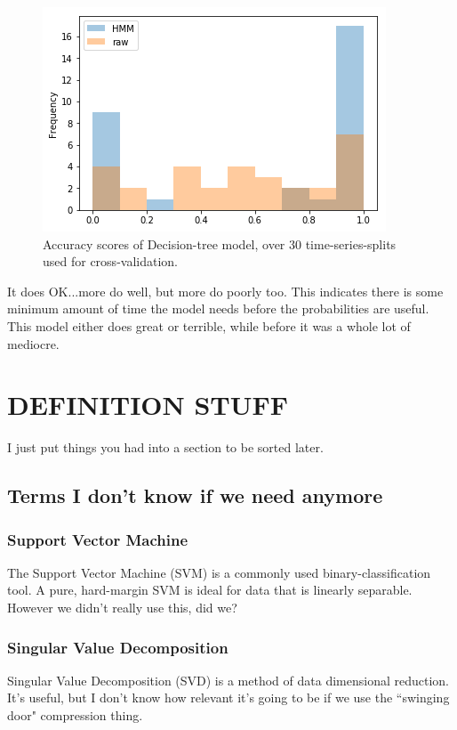 \documentclass[twocolumn,10pt]{article}
\begin{document}
\begin{figure}
    \centering
    \includegraphics[width=\linewidth]{clf.png}
    \caption{Accuracy scores of Decision-tree model, over 30 time-series-splits used for cross-validation. }
    \label{fig:supervised}
\end{figure}
It does OK...more do well, but more do poorly too. This indicates there is some minimum amount of time the model needs before the probabilities are useful. This model either does great or terrible, while before it was a whole lot of mediocre. 

\section{DEFINITION STUFF}
I just put things you had into a section to be sorted later. 
\subsection{Terms I don't know if we need anymore}

\subsubsection{Support Vector Machine}\cite{SVM}
The Support Vector Machine (SVM) is a commonly used binary-classification tool. A pure, hard-margin SVM is ideal for data that is linearly separable. However we didn't really use this, did we?

\subsubsection{Singular Value Decomposition}
Singular Value Decomposition (SVD) is a method of data dimensional reduction. It's useful, but I don't know how relevant it's going to be if we use the ``swinging door" compression thing.
\end{document}
